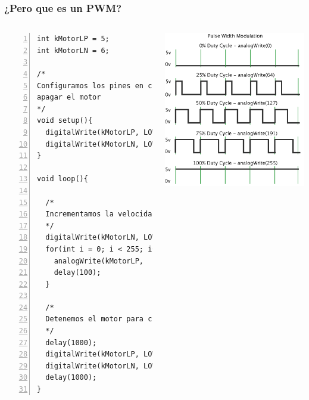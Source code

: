 \documentclass[compress]{beamer}
\begin{document}
\begin{frame}[fragile]
 \frametitle{¿Pero que es un PWM?}
 \begin{columns}
\begin{Verbatim}[formatcom=\color{red},fontseries=b, numbers=left,numbersep=3pt, fontsize=\tiny]
int kMotorLP = 5;
int kMotorLN = 6;

/*
Configuramos los pines en cero para
apagar el motor
*/
void setup(){
  digitalWrite(kMotorLP, LOW);
  digitalWrite(kMotorLN, LOW);
}

void loop(){

  /*
  Incrementamos la velocidad progresivamente
  */
  digitalWrite(kMotorLN, LOW);
  for(int i = 0; i < 255; i++){
  	analogWrite(kMotorLP,  i);
  	delay(100);
  }

  /*
  Detenemos el motor para comenzar nuevamente
  */
  delay(1000);
  digitalWrite(kMotorLP, LOW);
  digitalWrite(kMotorLN, LOW);
  delay(1000);
}
\end{Verbatim}
  \flushright
  \includegraphics[width=\columnwidth]{./img/PWM.png}
 \end{columns}

\begin{center}
 
\end{center}
\end{frame}
\end{document}
